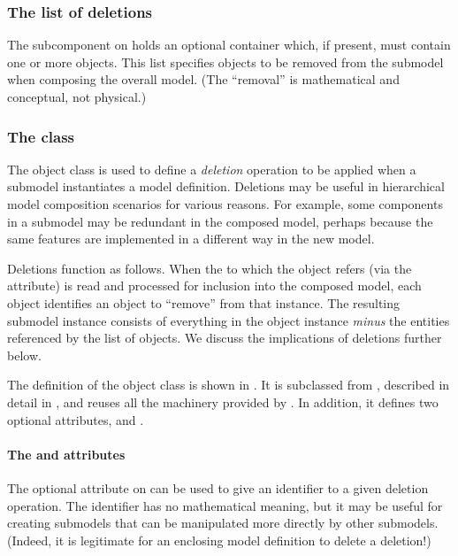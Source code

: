 \subsubsection{The list of deletions}
\label{listofdeletions}

The  subcomponent on \Submodel holds an optional \ListOfDeletions container which, if present, must contain one or more \Deletion objects.  This list specifies objects to be removed from the submodel when composing the overall model.  (The ``removal'' is mathematical and conceptual, not physical.)


\subsubsection{The  class}
\label{deletion-class}

The \Deletion object class is used to define a \emph{deletion} operation to be applied when a submodel instantiates a model definition. Deletions may be useful in hierarchical model composition scenarios for various reasons.  For example, some components in a submodel may be redundant in the composed model, perhaps because the same features are implemented in a different way in the new model.

Deletions function as follows.  When the \Model to which the \Submodel object refers (via the  attribute) is read and processed for inclusion into the composed model, each \Deletion object identifies an object to ``remove'' from that \Model instance.  The resulting submodel instance consists of everything in the \Model object instance \emph{minus} the entities referenced by the list of \Deletion objects. We discuss the implications of deletions further below.

The definition of the \Deletion object class is shown in .  It is subclassed from \SBaseRef, described in detail in , and reuses all the machinery provided by \SBaseRef.  In addition, it defines two optional attributes,  and .


\paragraph{The \fixttspace{} and \fixttspace{} attributes}

The optional attribute  on \Deletion can be used to give an identifier to a given deletion operation.  The identifier has no mathematical meaning, but it may be useful for creating submodels that can be manipulated more directly by other submodels.  (Indeed, it is legitimate for an enclosing model definition to delete a deletion!)

